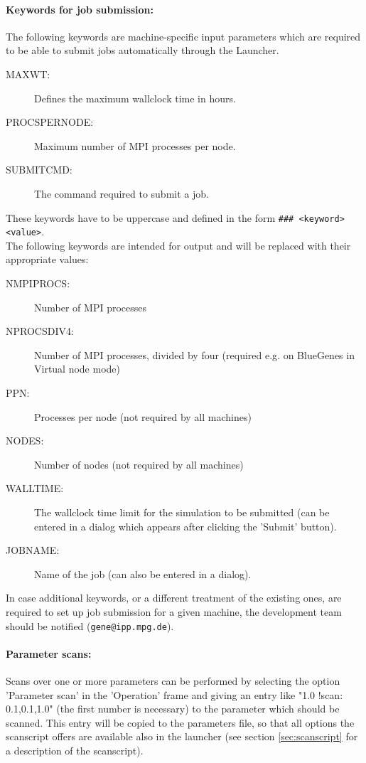 \documentclass[12pt]{article}
\begin{document}
\paragraph{Keywords for job submission:}
The following keywords are machine-specific input parameters which are required to be able to submit 
jobs automatically through the Launcher. 
\begin{description}
  \item[MAXWT:] Defines the maximum wallclock time in hours.
  \item[PROCSPERNODE:] Maximum number of MPI processes per node.
  \item[SUBMITCMD:] The command required to submit a job. 
 \end{description}
These keywords have to be uppercase and defined in the form \texttt{\#\#\#~<keyword> <value>}.\\
The following keywords are intended for output and will be replaced with their appropriate values:
\begin{description}
  \item[NMPIPROCS:] Number of MPI processes
  \item[NPROCSDIV4:] Number of MPI processes, divided by four (required e.g. on BlueGenes in Virtual 
    node mode)
  \item[PPN:] Processes per node (not required by all machines)
  \item[NODES:] Number of nodes (not required by all machines)
  \item[WALLTIME:] The wallclock time limit for the simulation to be submitted (can be entered in a 
    dialog which appears after clicking the 'Submit' button).
  \item[JOBNAME:] Name of the job (can also be entered in a dialog). 
\end{description}
In case additional keywords, or a different treatment of the existing ones, are required to set up 
job submission for a given machine, the \gene development team should be notified (\texttt{gene@ipp.mpg.de}).

\paragraph{Parameter scans:}
Scans over one or more parameters can be performed by selecting the option 'Parameter scan' in the 
'Operation' frame and giving an entry like "1.0 !scan: 0.1,0.1,1.0" (the first number is necessary) 
to the parameter which should be scanned. 
This entry will be copied to the parameters file, so that all options the scanscript offers are 
available also in the launcher (see section \ref{sec:scanscript} for a description of the scanscript). 
\end{document}
